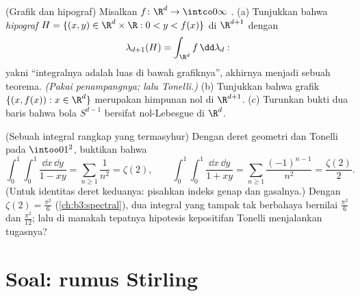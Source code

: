 \begin{exercise}[$\star\star$]\label{exo:b3:product:11}
(Grafik dan hipograf) Misalkan $f \colon \R^d \to \intco0\infty$
.
(a) Tunjukkan bahwa \emph{hipograf} $H = \{(x, y) \in
\R^d\times\R : 0 < y < f(x)\}$  di
$\R^{d+1}$ dengan
\[
\lambda_{d+1}(H) = \int_{\R^d}f\,\dd\lambda_d :
\]
yakni ``integralnya adalah luas di bawah grafiknya'', akhirnya menjadi sebuah
teorema. \emph{(Pakai penampangnya; lalu Tonelli.)}
(b) Tunjukkan bahwa grafik $\{(x, f(x)) : x \in \R^d\}$ merupakan
himpunan nol di $\R^{d+1}$.
(c) Turunkan bukti dua baris bahwa bola $S^{d-1}$ bersifat
nol-Lebesgue di $\R^d$.
\end{exercise}

\begin{exercise}[$\star\star$]\label{exo:b3:product:12}
(Sebuah integral rangkap yang termasyhur) Dengan deret geometri dan
Tonelli pada $\intoo01^2$, buktikan bahwa
\[
\int_0^1\!\!\int_0^1\frac{\dd x\,\dd y}{1 - xy}
= \sum_{n\geq1}\frac1{n^2} = \zeta(2),
\qquad
\int_0^1\!\!\int_0^1\frac{\dd x\,\dd y}{1 + xy}
= \sum_{n\geq1}\frac{(-1)^{n-1}}{n^2} = \frac{\zeta(2)}2 .
\]
(Untuk identitas deret keduanya: pisahkan indeks genap dan gasalnya.)
Dengan $\zeta(2) = \frac{\pi^2}6$ (\cref{ch:b3:spectral}), dua
integral yang tampak tak berbahaya bernilai $\frac{\pi^2}6$ dan
$\frac{\pi^2}{12}$; lalu di manakah tepatnya hipotesis kepositifan Tonelli
menjalankan tugasnya?
\end{exercise}

\section{Soal: rumus Stirling}

